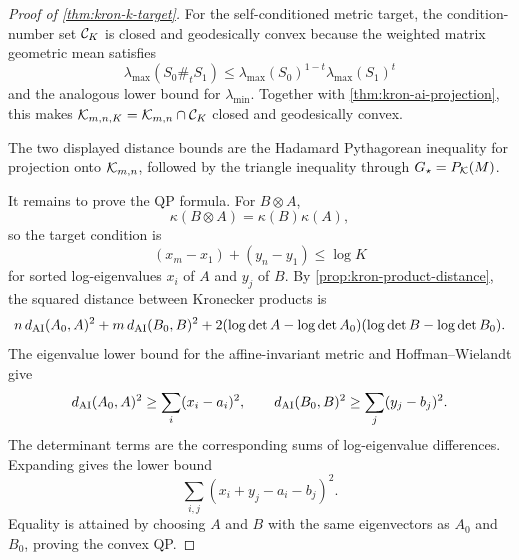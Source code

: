 \begin{proof}[Proof of \cref{thm:kron-k-target}]
For the self-conditioned metric target, the condition-number set \(\mathcal C_K\) is
closed and geodesically convex because
the weighted matrix geometric mean satisfies
\[
  \lambda_{\max}(S_0\#_tS_1)
  \le
  \lambda_{\max}(S_0)^{1-t}\lambda_{\max}(S_1)^t
\]
and the analogous lower bound for \(\lambda_{\min}\). Together with
\cref{thm:kron-ai-projection}, this makes
\(\mathcal K_{m,n,K}=\mathcal K_{m,n}\cap\mathcal C_K\) closed and geodesically convex.

The two displayed distance bounds are the Hadamard Pythagorean inequality for
projection onto \(\mathcal K_{m,n}\), followed by the triangle inequality through
\(G_\star=P_{\mathcal K}(M)\).

It remains to prove the QP formula. For \(B\otimes A\),
\[
  \kappa(B\otimes A)=\kappa(B)\kappa(A),
\]
so the target condition is
\[
  (x_m-x_1)+(y_n-y_1)\le\log K
\]
for sorted log-eigenvalues \(x_i\) of \(A\) and \(y_j\) of \(B\). By
\cref{prop:kron-product-distance}, the squared distance between Kronecker products
is
\[
  n\,d_{\mathrm{AI}}(A_0,A)^2+m\,d_{\mathrm{AI}}(B_0,B)^2
  +2(\log\det A-\log\det A_0)(\log\det B-\log\det B_0).
\]
The eigenvalue lower bound for the affine-invariant metric and
Hoffman--Wielandt give
\[
  d_{\mathrm{AI}}(A_0,A)^2\ge\sum_i(x_i-a_i)^2,\qquad
  d_{\mathrm{AI}}(B_0,B)^2\ge\sum_j(y_j-b_j)^2.
\]
The determinant terms are the corresponding sums of log-eigenvalue
differences. Expanding gives the lower bound
\[
  \sum_{i,j}(x_i+y_j-a_i-b_j)^2.
\]
Equality is attained by choosing \(A\) and \(B\) with the same eigenvectors as
\(A_0\) and \(B_0\), proving the convex QP.
\end{proof}

